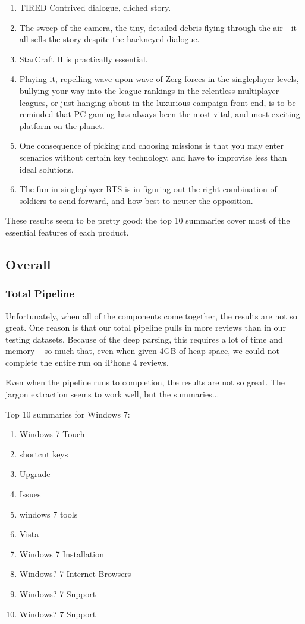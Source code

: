 \documentclass{article}
\begin{document}
\begin{description}
\begin{enumerate}
\item TIRED Contrived dialogue, cliched story.
\item The sweep of the camera, the tiny, detailed debris flying through the air - it all sells the story despite the hackneyed dialogue.
\item StarCraft II is practically essential.
\item Playing it, repelling wave upon wave of Zerg forces in the singleplayer levels, bullying your way into the league rankings in the relentless multiplayer leagues, or just hanging about in the luxurious campaign front-end, is to be reminded that PC gaming has always been the most vital, and most exciting platform on the planet.
\item One consequence of picking and choosing missions is that you may enter scenarios without certain key technology, and have to improvise less than ideal solutions.
\item The fun in singleplayer RTS is in figuring out the right combination of soldiers to send forward, and how best to neuter the opposition.
\end{enumerate}
\end{description}

These results seem to be pretty good; the top 10 summaries cover most of the
essential features of each product.

\subsection{Overall}
\subsubsection{Total Pipeline}
Unfortunately, when all of the components come together, the results are not
so great. One reason is that our total pipeline pulls in more reviews than in
our testing datasets. Because of the deep parsing, this requires a lot of time
and memory -- so much that, even when given 4GB of heap space, we could not
complete the entire run on iPhone 4 reviews.

Even when the pipeline runs to completion, the results are not so great.
The jargon extraction seems to work well, but the summaries...

Top 10 summaries for Windows 7:
\begin{enumerate}
\item Windows 7 Touch
\item shortcut keys
\item Upgrade
\item Issues
\item windows 7 tools
\item Vista
\item Windows 7 Installation
\item Windows? 7 Internet Browsers
\item Windows? 7 Support
\item Windows? 7 Support
\end{enumerate}
\end{document}

